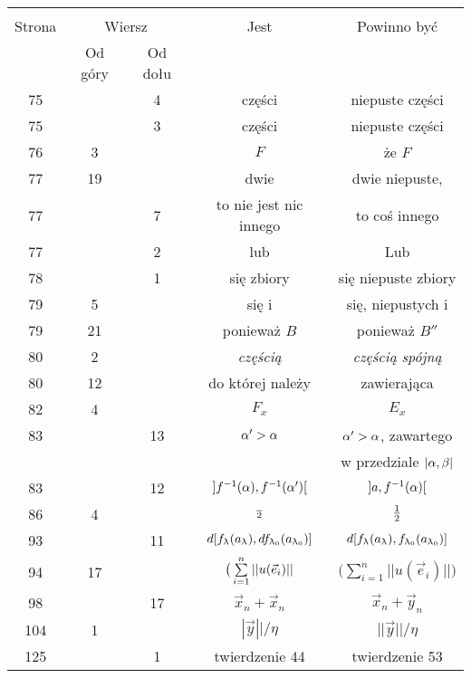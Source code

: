 \documentclass[a4paper,11pt]{article}
\begin{document}
\begin{center}
  \begin{tabular}{|c|c|c|c|c|}
    \hline
    & \multicolumn{2}{c|}{} & & \\
    Strona & \multicolumn{2}{c|}{Wiersz}& Jest & Powinno być \\ \cline{2-3}
    & Od góry & Od dołu &  &  \\ \hline
    75  & &  4 & części & niepuste części \\
    75  & &  3 & części & niepuste części \\
    76  &  3 & & $F$ & że $F$ \\
    77  & 19 & & dwie & dwie niepuste, \\
    77  & &  7 & to nie jest nic innego & to coś innego \\
    77  & &  2 & lub & Lub \\
    78  & &  1 & się zbiory & się niepuste zbiory \\
    79  &  5 & & się i & się, niepustych i \\
    79  & 21 & & ponieważ $B$ & ponieważ $B''$ \\
    80  &  2 & & \emph{częścią} & \emph{częścią spójną} \\
    80  & 12 & & do której należy & zawierająca \\
    82  &  4 & & $F_{ x }$ & $E_{ x }$ \\
    83  & & 13 & $\alpha' > \alpha$ & $\alpha' > \alpha$, zawartego \\
    & & & & w przedziale $| \alpha, \beta |$ \\
    83  & & 12 & $] f^{ - 1 }( \alpha ), f^{ -1 }( \alpha' ) [$
           & $] a, f^{ -1 }( \alpha ) [$ \\
    86  &  4 & & $\frac{ }{ 2 }$ & $\frac{ 1 }{ 2 }$ \\
    93  & & 11 & $d[ f_{ \uplambda }( a_{ \uplambda } ), df_{ \uplambda_{ 0 } }
                 ( a_{ \uplambda_{ 0 } } ) ]$
           & $d[ f_{ \uplambda }( a_{ \uplambda } ), f_{ \uplambda_{ 0 } }
             ( a_{ \uplambda_{ 0 } } ) ]$ \\
    94  & 17 & & $\big( \sum\limits_{ i = 1 }^{ n } | | u( \vec{ e }_{ i } ) | |$
           & $\big( \sum_{ i = 1 }^{ n }
             | | u( \vec{ e }_{ i } ) | | \big)$ \\
    98  & & 17 & $\vec{ x }_{ n } + \vec{ x }_{ n }$ & $\vec{ x }_{ n }
                                                       + \vec{ y }_{ n }$ \\
    104 &  1 & & $| \vec{ y } || / \eta$ & $|| \vec{ y } || / \eta$ \\
    125 & &  1 & twierdzenie 44 & twierdzenie 53 \\

\end{tabular}
\end{center}
\end{document}
